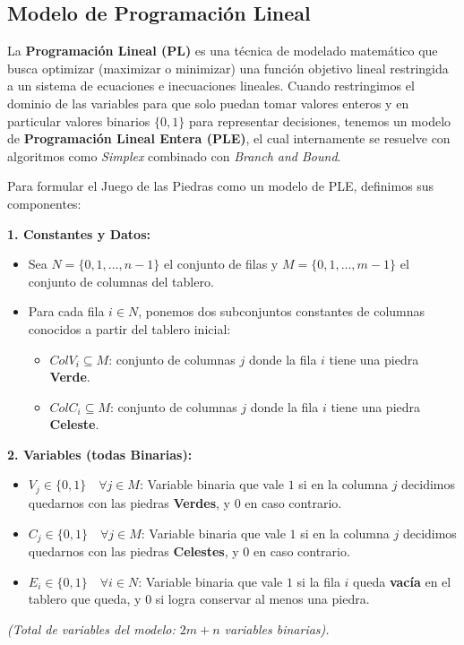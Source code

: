 \subsection{Modelo de Programación Lineal}

La \textbf{Programación Lineal (PL)} es una técnica de modelado matemático que busca optimizar (maximizar o minimizar) una función objetivo lineal restringida a un sistema de ecuaciones e inecuaciones lineales. Cuando restringimos el dominio de las variables para que solo puedan tomar valores enteros y en particular valores binarios $\{0, 1\}$ para representar decisiones, tenemos un modelo de \textbf{Programación Lineal Entera (PLE)}, el cual internamente se resuelve con algoritmos como \textit{Simplex} combinado con \textit{Branch and Bound}.

Para formular el Juego de las Piedras como un modelo de PLE, definimos sus componentes:

\textbf{1. Constantes y Datos:}
\begin{itemize}
    \item Sea $N = \{0, 1, \dots, n-1\}$ el conjunto de filas y $M = \{0, 1, \dots, m-1\}$ el conjunto de columnas del tablero.
    \item Para cada fila $i \in N$, ponemos dos subconjuntos constantes de columnas conocidos a partir del tablero inicial:
    \begin{itemize}
        \item $ ColV_i \subseteq M $: conjunto de columnas $j$ donde la fila $i$ tiene una piedra \textbf{Verde}.
        \item $ ColC_i \subseteq M $: conjunto de columnas $j$ donde la fila $i$ tiene una piedra \textbf{Celeste}.
    \end{itemize}
\end{itemize}

\textbf{2. Variables (todas Binarias):}
\begin{itemize}
    \item $V_j \in \{0, 1\} \quad \forall j \in M$: Variable binaria que vale $1$ si en la columna $j$ decidimos quedarnos con las piedras \textbf{Verdes}, y $0$ en caso contrario.
    \item $C_j \in \{0, 1\} \quad \forall j \in M$: Variable binaria que vale $1$ si en la columna $j$ decidimos quedarnos con las piedras \textbf{Celestes}, y $0$ en caso contrario.
    \item $E_i \in \{0, 1\} \quad \forall i \in N$: Variable binaria que vale $1$ si la fila $i$ queda \textbf{vacía} en el tablero que queda, y $0$ si logra conservar al menos una piedra.
\end{itemize}
\textit{(Total de variables del modelo: $2m + n$ variables binarias).}

